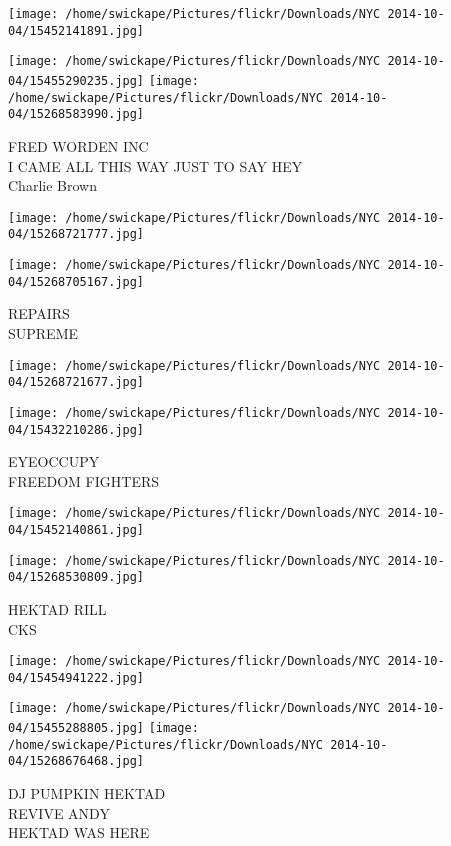 \documentclass[10pt,letterpaper]{article}
\begin{document}
\texttt{[image: /home/swickape/Pictures/flickr/Downloads/NYC 2014-10-04/15452141891.jpg]}

\vspace{0.25in}
\texttt{[image: /home/swickape/Pictures/flickr/Downloads/NYC 2014-10-04/15455290235.jpg]}
\texttt{[image: /home/swickape/Pictures/flickr/Downloads/NYC 2014-10-04/15268583990.jpg]}

FRED WORDEN INC\\
I CAME ALL THIS WAY JUST TO SAY HEY\\
Charlie Brown
\pagebreak

\texttt{[image: /home/swickape/Pictures/flickr/Downloads/NYC 2014-10-04/15268721777.jpg]}

\vspace{0.25in}
\texttt{[image: /home/swickape/Pictures/flickr/Downloads/NYC 2014-10-04/15268705167.jpg]}

REPAIRS\\
SUPREME
\pagebreak

\texttt{[image: /home/swickape/Pictures/flickr/Downloads/NYC 2014-10-04/15268721677.jpg]}

\vspace{0.25in}
\texttt{[image: /home/swickape/Pictures/flickr/Downloads/NYC 2014-10-04/15432210286.jpg]}

EYEOCCUPY\\
FREEDOM FIGHTERS
\pagebreak

\texttt{[image: /home/swickape/Pictures/flickr/Downloads/NYC 2014-10-04/15452140861.jpg]}

\vspace{0.25in}
\texttt{[image: /home/swickape/Pictures/flickr/Downloads/NYC 2014-10-04/15268530809.jpg]}

HEKTAD RILL\\
CKS
\pagebreak

\texttt{[image: /home/swickape/Pictures/flickr/Downloads/NYC 2014-10-04/15454941222.jpg]}

\vspace{0.25in}
\texttt{[image: /home/swickape/Pictures/flickr/Downloads/NYC 2014-10-04/15455288805.jpg]}
\texttt{[image: /home/swickape/Pictures/flickr/Downloads/NYC 2014-10-04/15268676468.jpg]}

DJ PUMPKIN HEKTAD\\
REVIVE ANDY\\
HEKTAD WAS HERE
\pagebreak
\end{document}
